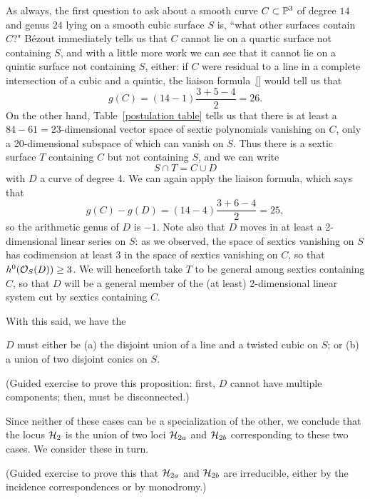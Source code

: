 As always, the first question to ask about a smooth curve $C \subset \PP^3$ of degree $14$ and genus $24$ lying on a smooth cubic surface $S$ is, ``what other surfaces contain $C$?" B\'ezout immediately tells us that $C$ cannot lie on a quartic surface not containing $S$, and with a little more work we can see that it cannot lie on a quintic surface not containing $S$, either: if $C$ were residual to a line in a complete intersection of a cubic and a quintic, the liaison formula~\ref{} would tell us that 
$$
g(C) = (14-1)\frac{3+5-4}{2} = 26.
$$
On the other hand, Table~\ref{postulation table} tells us that there is at least a $84-61 = 23$-dimensional vector space of sextic polynomials vanishing on  $C$, only a 20-dimensional subspace of which can vanish on $S$. Thus there is a sextic surface $T$ containing $C$ but not containing $S$, and we can write
$$
S \cap T = C \cup D
$$
with $D$ a curve of degree 4. We can again apply the liaison formula, which says that
$$
g(C) - g(D) = (14 - 4)\frac{3+6-4}{2} = 25,
$$
so the arithmetic genus of $D$ is $-1$. Note also that $D$ moves in at least a 2-dimensional linear series on $S$: as we observed, the space of sextics vanishing on $S$ has codimension at least 3 in the space of sextics vanishing on $C$, so that $h^0(\cO_S(D)) \geq 3$. We will henceforth take $T$ to be general among sextics containing $C$, so that $D$ will be a general member of the (at least) 2-dimensional linear system cut by sextics containing $C$.

With this said, we have the

\begin{proposition}
$D$ must either be (a) the disjoint union of a line and a twisted cubic on $S$; or (b) a union of two disjoint conics on $S$.
\end{proposition}

\begin{exercise}
(Guided exercise to prove this proposition: first, $D$ cannot have multiple components; then, must be disconnected.)
\end{exercise}

Since neither of these cases can be a specialization of the other, we conclude that the locus $\cH_2$ is the union of two loci $\cH_{2a}$ and $\cH_{2b}$ corresponding to these two cases. We consider these in turn.


\begin{exercise}
(Guided exercise to prove this that $\cH_{2a}$ and $\cH_{2b}$ are irreducible, either by the incidence correspondences or by monodromy.)
\end{exercise}


